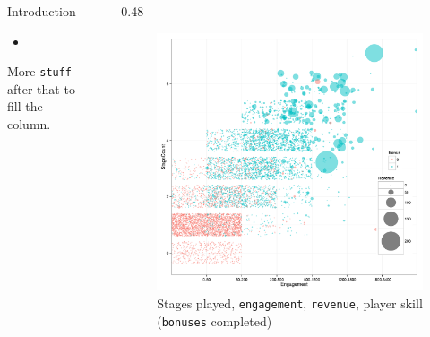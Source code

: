 \documentclass[final,size=a3]{beamer}
\newlength{\sepwid}
\newlength{\onecolwid}
\newlength{\threecolwid}
\begin{document}
\begin{frame}[t]
\begin{columns}[t]
\begin{column}{\onecolwid}
\begin{block}{Introduction}
\begin{itemize}
\item 
\end{itemize}

More \texttt{stuff} after that to fill the column.

\end{block}

\end{column} %

\begin{column}{\sepwid}
\end{column} %

\begin{column}{\threecolwid} %

\begin{columns}[t]

\begin{column}{0.48\threecolwid}

\vspace{-25mm}

\begin{figure}[h]
\caption{Stages played, \texttt{engagement}, \texttt{revenue}, player skill (\texttt{bonuses} completed)}
\vspace{0mm}
\includegraphics[scale=1.75]{images/bubsplot}
\end{figure}


\end{column}
\end{columns}
\end{column}
\end{columns}
\end{frame}
\end{document}
